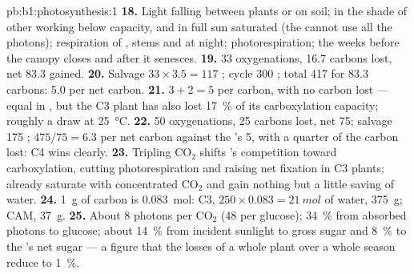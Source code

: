 \begin{solution}{pb:b1:photosynthesis:1}
\textbf{18.} Light falling between plants or on soil;  in the
shade of other  working below capacity, and  in full sun
saturated (the  cannot use all the photons); respiration of
, stems and at night; photorespiration; the weeks before the
canopy closes and after it senesces.
\textbf{19.} 33 oxygenations, 16.7 carbons lost, net 83.3 gained.
\textbf{20.} Salvage $33\times 3.5 = 117$ ; cycle 300 ; total
417  for 83.3 carbons: 5.0  per net carbon.
\textbf{21.} $3 + 2 = 5$  per carbon, with no carbon lost --- equal
in , but the C3 plant has also lost \qty{17}{\%} of its carboxylation
capacity; roughly a draw at \qty{25}{\celsius}.
\textbf{22.} 50 oxygenations, 25 carbons lost, net 75; salvage 175 ;
$475/75 = 6.3$  per net carbon against the 's 5, with a
quarter of the carbon lost: C4 wins clearly.
\textbf{23.} Tripling $\mathrm{CO_2}$ shifts 's competition
toward carboxylation, cutting photorespiration and raising net fixation
in C3 plants;  already saturate  with concentrated
$\mathrm{CO_2}$ and gain nothing but a little saving of water.
\textbf{24.} \qty{1}{g} of carbon is \qty{0.083}{mol}: C3, $250\times 0.083 = \qty{21}{mol}$ of water, \qty{375}{g}; CAM, \qty{37}{g}.
\textbf{25.} About 8 photons per $\mathrm{CO_2}$ (48 per glucose);
\qty{34}{\%} from absorbed photons to glucose; about \qty{14}{\%} from
incident sunlight to gross sugar and \qty{8}{\%} to the 's net
sugar --- a figure that the losses of a whole plant over a whole
season reduce to \qty{1}{\%}.
\end{solution}
